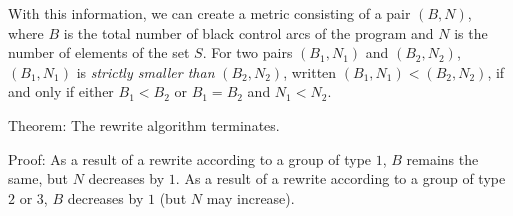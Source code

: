 With this information, we can create a metric consisting of a pair
$(B,N)$, where $B$ is the total number of black control arcs of the
program and $N$ is the number of elements of the set $S$.  For two
pairs $(B_1,N_1)$ and $(B_2,N_2)$, $(B_1,N_1)$ is \emph{strictly
  smaller than} $(B_2,N_2)$, written $(B_1,N_1) < (B_2,N_2)$, if and
only if either $B_1 < B_2$ or $B_1 = B_2$ and $N_1 < N_2$.

Theorem: The rewrite algorithm terminates.

Proof: As a result of a rewrite according to a group of type $1$, $B$
remains the same, but $N$ decreases by $1$.  As a result of a rewrite
according to a group of type $2$ or $3$, $B$ decreases by $1$ (but $N$
may increase).
